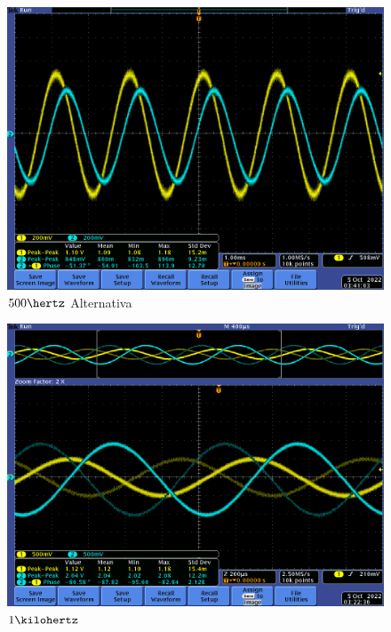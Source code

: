 \documentclass[12pt,letterpaper]{article}     %
\begin{document}
{\begin{figure}[!ht]
\centering
\includegraphics[scale=0.5]{imagenes/22.png}
\caption{$500\hertz$ Alternativa}
\label{fig:22}
\end{figure}

\begin{figure}[!ht]
\centering
\includegraphics[scale=0.5]{imagenes/14.png}
\caption{$1\kilohertz$}
\label{fig:14}
\end{figure}

}
\end{document}
